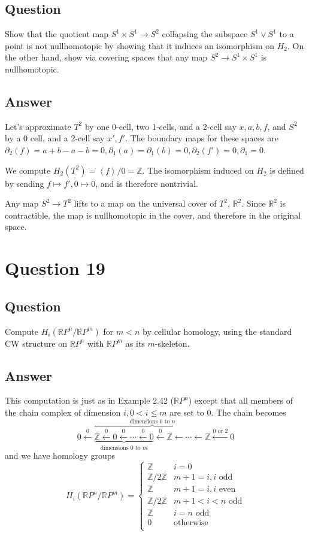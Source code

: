 \documentclass[11pt]{article}
\begin{document}
\subsection{Question}
Show that the quotient map $S^1 \times S^1 \to S^2$ collapsing the subspace $S^1 \vee S^1$ to a point is not nullhomotopic by showing that it induces an isomorphism on $H_2$. On the other hand, show via covering spaces that any map $S^2 \to S^1 \times S^1$ is nullhomotopic.
\subsection{Answer}
Let's approximate $T^2$ by one 0-cell, two 1-cells, and a 2-cell say $x, a,b, f$, and $S^2$ by a 0 cell, and a 2-cell say $x', f'$. The boundary maps for these spaces are $\partial_2(f) = a+b-a-b=0, \partial_1(a) =\partial_1(b) = 0, \partial_2(f')=0, \partial_1=0$. 

We compute $H_2(T^2) = \left< f\right> / 0 = \mathbb{Z}$. The isomorphism induced on $H_2$ is defined by sending $f\mapsto f', 0 \mapsto 0$, and is therefore nontrivial.

Any map $S^2 \to T^2$ lifts to a map on the universal cover of $T^2$, $\mathbb{R}^2$. Since $\mathbb{R}^2$ is contractible, the map is nullhomotopic in the cover, and therefore in the original space.

\section{Question 19}
\subsection{Question}
Compute $H_i(\mathbb{R}P^n / \mathbb{R}P^m)$ for $m < n $ by cellular homology, using the standard CW structure on $\mathbb{R}P^n$ with $\mathbb{R}P^m$ as its $m$-skeleton.
\subsection{Answer}
This computation is just as in  Example 2.42 ($\mathbb{R}P^n$) except that all members of the chain complex of dimension $i, 0< i \leq m$ are set to 0. The  chain becomes
\[ 0 \stackrel{0}{\leftarrow} \overbrace{ \underbrace{\mathbb{Z} \stackrel{0}{\leftarrow}  0 \stackrel{0}{\leftarrow}  \cdots \stackrel{0}{\leftarrow}  0 }_{\mbox{dimensions $0$ to $m$}}\stackrel{0}{\leftarrow}  \mathbb{Z} \leftarrow \cdots \leftarrow \mathbb{Z}}^{\mbox{dimensions 0 to $n$}} \stackrel{\mbox{0 or 2}}{\longleftarrow}  0\]
and we have homology groups
\[H_i(\mathbb{R}P^n / \mathbb{R}P^m) = \left\{ \begin{array}{ll} \mathbb{Z} & i=0\\ \mathbb{Z} /2 \mathbb{Z}& m+1 = i , i \mbox{ odd} \\ \mathbb{Z}& m+1 = i , i \mbox{ even} \\ \mathbb{Z}/2\mathbb{Z} & m+1< i < n \mbox{ odd}  \\ \mathbb{Z}& i = n \mbox{ odd}\\  0&\mbox{otherwise}\\ \end{array} \right.\]
\end{document}

